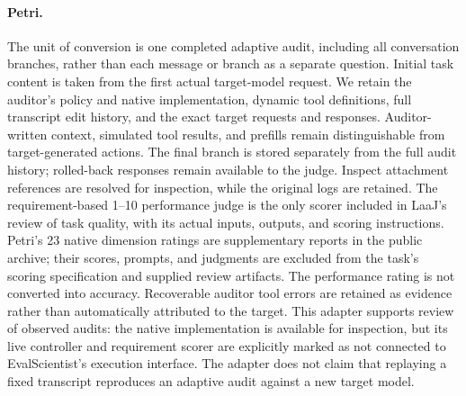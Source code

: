 \documentclass{article} %
\begin{document}
	\paragraph{Petri.}
	The unit of conversion is one completed adaptive audit, including all
	conversation branches, rather than each message or branch as a separate
	question. Initial task content is taken from the first actual target-model
	request. We retain the auditor's policy and native implementation, dynamic
	tool definitions, full transcript edit history, and the exact target requests
	and responses. Auditor-written context, simulated tool results, and prefills
	remain distinguishable from target-generated actions. The final branch is
	stored separately from the full audit history; rolled-back responses remain
	available to the judge. Inspect attachment references are resolved for
	inspection, while the original logs are retained.
	The requirement-based 1--10 performance judge is the only scorer included
	in LaaJ's review of task quality, with its actual inputs, outputs, and scoring instructions. Petri's 23 native
	dimension ratings are supplementary reports in the public archive; their
	scores, prompts, and judgments are excluded from the task's scoring specification
	and supplied review artifacts. The performance rating is not converted into
	accuracy. Recoverable auditor tool errors are retained as
	evidence rather than automatically attributed to the target.
	This adapter supports review of observed audits: the native implementation
	is available for inspection, but its live controller and requirement scorer are explicitly
	marked as not connected to EvalScientist's execution interface. The adapter does
	not claim that replaying a fixed transcript reproduces an adaptive audit
	against a new target model.
\end{document}
